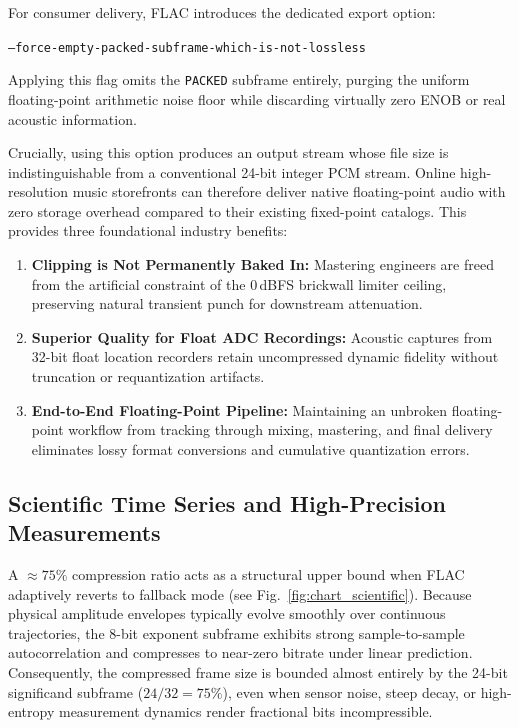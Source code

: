 \documentclass[10pt,twocolumn]{article}
\begin{document}
For consumer delivery, FLAC introduces the dedicated export option:
\begin{center}
	\vspace{-0.5ex}
	\footnotesize\texttt{--force-empty-packed-subframe-which-is-not-lossless}
	\vspace{-0.5ex}
\end{center}
Applying this flag omits the \texttt{PACKED} subframe entirely, purging the uniform floating-point arithmetic noise floor while discarding virtually zero ENOB or real acoustic information.

Crucially, using this option produces an output stream whose file size is indistinguishable from a conventional 24-bit integer PCM stream. Online high-resolution music storefronts can therefore deliver native floating-point audio with zero storage overhead compared to their existing fixed-point catalogs. This provides three foundational industry benefits:
\begin{enumerate}
	\item \textbf{Clipping is Not Permanently Baked In:} Mastering engineers are freed from the artificial constraint of the 0\,dBFS brickwall limiter ceiling, preserving natural transient punch for downstream attenuation.
	\item \textbf{Superior Quality for Float ADC Recordings:} Acoustic captures from 32-bit float location recorders retain uncompressed dynamic fidelity without truncation or requantization artifacts.
	\item \textbf{End-to-End Floating-Point Pipeline:} Maintaining an unbroken floating-point workflow from tracking through mixing, mastering, and final delivery eliminates lossy format conversions and cumulative quantization errors.
\end{enumerate}

\subsection{Scientific Time Series and High-Precision Measurements}
A $\approx 75\%$ compression ratio acts as a structural upper bound when FLAC adaptively reverts to fallback mode (see Fig.~\ref{fig:chart_scientific}). Because physical amplitude envelopes typically evolve smoothly over continuous trajectories, the 8-bit exponent subframe exhibits strong sample-to-sample autocorrelation and compresses to near-zero bitrate under linear prediction. Consequently, the compressed frame size is bounded almost entirely by the 24-bit significand subframe ($24/32 = 75\%$), even when sensor noise, steep decay, or high-entropy measurement dynamics render fractional bits incompressible.
\end{document}

